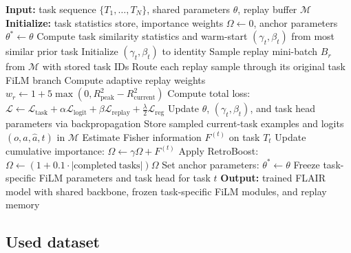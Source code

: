 \documentclass[3p,times,procedia]{elsarticle}
\begin{document}
\begin{algorithm}[h!]
\caption{FLAIR Incremental Training Procedure}
\label{alg:flair}
\begin{algorithmic}[1]
\STATE \textbf{Input:} task sequence $\{T_1, \ldots, T_N\}$, shared parameters $\theta$, replay buffer $\mathcal{M}$
\STATE \textbf{Initialize:} task statistics store, importance weights $\Omega \leftarrow 0$, anchor parameters $\theta^* \leftarrow \theta$
        \STATE Compute task similarity statistics and warm-start $(\gamma_t, \beta_t)$ from most similar prior task
    \ELSE
        \STATE Initialize $(\gamma_t, \beta_t)$ to identity
    \ENDIF
        \STATE Sample replay mini-batch $B_r$ from $\mathcal{M}$ with stored task IDs
        \STATE Route each replay sample through its original task FiLM branch
        \STATE Compute adaptive replay weights $w_r \leftarrow 1 + 5\max(0, R^2_{\mathrm{peak}} - R^2_{\mathrm{current}})$
        \STATE Compute total loss:
        \STATE \hspace{1.0em}$\mathcal{L} \leftarrow \mathcal{L}_{\mathrm{task}} + \alpha\mathcal{L}_{\mathrm{logit}} + \beta\mathcal{L}_{\mathrm{replay}} + \frac{\lambda}{2}\mathcal{L}_{\mathrm{reg}}$
        \STATE Update $\theta$, $(\gamma_t, \beta_t)$, and task head parameters via backpropagation
        \STATE Store sampled current-task examples and logits $(o, a, \hat{a}, t)$ in $\mathcal{M}$
    \ENDFOR
    \STATE Estimate Fisher information $F^{(t)}$ on task $T_t$
    \STATE Update cumulative importance: $\Omega \leftarrow \gamma\Omega + F^{(t)}$
    \STATE Apply RetroBoost: $\Omega \leftarrow (1 + 0.1\cdot |\mathrm{completed\ tasks}|)\Omega$
    \STATE Set anchor parameters: $\theta^* \leftarrow \theta$
    \STATE Freeze task-specific FiLM parameters and task head for task $t$
\ENDFOR
\STATE \textbf{Output:} trained FLAIR model with shared backbone, frozen task-specific FiLM modules, and replay memory
\end{algorithmic}
\end{algorithm}


\subsection{Used dataset}

\end{document}
